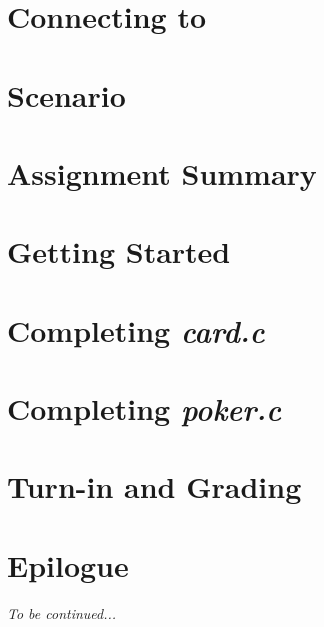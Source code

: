 \documentclass[12pt]{article}
\begin{document}
    \labidentifier


    \section{Connecting to \runtimeenvironment} \label{sec:connecting}  

    \softwareengineeringfrontmatter

    \section*{Scenario}                                                 \scenariointroduction

    \section{Assignment Summary}                                        

    \section{Getting Started} \label{sec:gettingstarted}                

    \section{Completing \textit{card.c}} \label{sec:completingcard}     

    \section{Completing \textit{poker.c}} \label{sec:completingpoker}   

    \section{Turn-in and Grading}                                       

    \section*{Epilogue}                                                 \scenariowrapup

    \textit{To be continued...}
\end{document}
